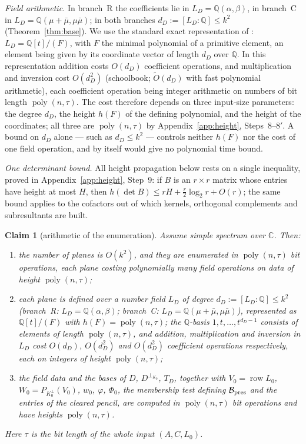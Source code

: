 \documentclass[journal]{IEEEtran}
\theoremstyle{plainn}
\newtheorem{claim}[thm]{Claim}
\theoremstyle{remark}
\newcommand{\row}{\operatorname{row}}
\newcommand{\poly}{\operatorname{poly}}
\begin{document}
\emph{Field arithmetic.} In branch~R the coefficients lie in $L_D=\mathbb Q(\alpha,\beta)$, in branch~C in
$L_D=\mathbb Q(\mu+\bar\mu,\mu\bar\mu)$; in both branches $d_D:=[L_D:\mathbb Q]\le k^2$
(Theorem~\ref{thm:base}). We use the standard exact representation of \cite{cohen93}: $L_D=\mathbb Q[t]/(F)$, with $F$
the minimal polynomial of a primitive element, an element being given by
its coordinate vector of length $d_D$ over $\mathbb Q$. In this representation addition costs $O(d_D)$
coefficient operations, and multiplication and inversion cost $O(d_D^2)$ (schoolbook; $\widetilde O(d_D)$
with fast polynomial arithmetic), each coefficient operation being integer arithmetic on numbers of bit
length $\poly(n,\tau)$. The cost therefore depends on three input-size parameters: the degree $d_D$, the
height $h(F)$ of the defining polynomial, and the height of the coordinates; all three are $\poly(n,\tau)$
by Appendix~\ref{app:height}, Steps~$8$--$8'$. A bound on $d_D$ alone --- such as $d_D\le k^2$ --- controls
neither $h(F)$ nor the cost of one field operation, and by itself would give no polynomial time bound.

\emph{One determinant bound.} All height propagation below rests on a single inequality, proved in
Appendix~\ref{app:height}, Step~9: if $B$ is an $r\times r$ matrix whose entries have height at most $H$,
then $h(\det B)\le rH+\tfrac{r}{2}\log_2 r+O(r)$; the same bound applies to the cofactors out of which
kernels, orthogonal complements and subresultants are built.

\begin{claim}[arithmetic of the enumeration]\label{clm:arith}
Assume simple spectrum over $\mathbb C$. Then:
\begin{enumerate}[label=(\roman*),leftmargin=*,itemsep=1pt,topsep=2pt]
\item the number of planes is $O(k^2)$, and they are enumerated in $\poly(n,\tau)$ bit operations, each
plane costing polynomially many field operations on data of height $\poly(n,\tau)$;
\item each plane is defined over a number field $L_D$ of degree $d_D:=[L_D:\mathbb Q]\le k^2$
(branch~R: $L_D=\mathbb Q(\alpha,\beta)$; branch~C: $L_D=\mathbb Q(\mu+\bar\mu,\mu\bar\mu)$),
represented as $\mathbb Q[t]/(F)$ with $h(F)=\poly(n,\tau)$; the
$\mathbb Q$-basis $1,t,\dots,t^{d_D-1}$ consists of elements of length $\poly(n,\tau)$, and addition,
multiplication and inversion in $L_D$ cost $O(d_D)$, $O(d_D^2)$ and $O(d_D^2)$ coefficient operations
respectively, each on integers of height $\poly(n,\tau)$;
\item the field data and the bases of $D$, $D^{\perp_{K_0}}$, $T_D$, together with $V_0=\row L_0$,
$W_0=P_{K_0^\perp}(V_0)$, $w_0$, $\varphi$, $\Phi_0$, the membership test defining $\mathcal B_{\rm pres}$ and the
entries of the cleared pencil, are computed in $\poly(n,\tau)$ bit operations and have heights
$\poly(n,\tau)$.
\end{enumerate}
Here $\tau$ is the bit length of the whole input $(A,C,L_0)$.
\end{claim}
\end{document}

